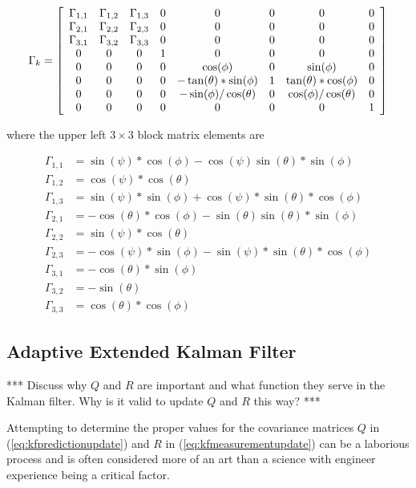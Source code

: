 \begin{align*}
\Gamma_k = \left[\begin{array}{c c c c c c c c}
\Gamma_{1,1} & \Gamma_{1,2} & \Gamma_{1,3} & 0 & 0 & 0 & 0 & 0 \\
\Gamma_{2,1} & \Gamma_{2,2} & \Gamma_{2,3} & 0 & 0 & 0 & 0 & 0 \\
\Gamma_{3,1} & \Gamma_{3,2} & \Gamma_{3,3} & 0 & 0 & 0 & 0 & 0 \\
0 & 0 & 0 & 1 & 0 & 0 & 0 & 0 \\
0 & 0 & 0 & 0 & \cos(\phi) & 0 & \sin(\phi) & 0 \\
0 & 0 & 0 & 0 & -\tan(\theta)*\sin(\phi) & 1 & \tan(\theta)*\cos(\phi) & 0 \\
0 & 0 & 0 & 0 & -\sin(\phi) / \cos(\theta) & 0 & \cos(\phi)/\cos(\theta) & 0 \\
0 & 0 & 0 & 0 & 0 & 0 & 0 & 1
\end{array}\right]
\end{align*}

where the upper left $3\times 3$ block matrix elements are

\begin{align*}
\Gamma_{1,1} &= \sin(\psi)*\cos(\phi)-\cos(\psi)\sin(\theta)*\sin(\phi) \\
\Gamma_{1,2} &= \cos(\psi)*\cos(\theta) \\
\Gamma_{1,3} &= \sin(\psi)*\sin(\phi)+\cos(\psi)*\sin(\theta)*\cos(\phi) \\
\Gamma_{2,1} &= -\cos(\theta)*\cos(\phi)-\sin(\theta)\sin(\theta)*\sin(\phi) \\
\Gamma_{2,2} &= \sin(\psi)*\cos(\theta) \\
\Gamma_{2,3} &= -\cos(\psi)*\sin(\phi)-\sin(\psi)*\sin(\theta)*\cos(\phi) \\
\Gamma_{3,1} &= -\cos(\theta)*\sin(\phi) \\
\Gamma_{3,2} &= -\sin(\theta) \\
\Gamma_{3,3} &= \cos(\theta)*\cos(\phi)
\end{align*}

\subsection{Adaptive Extended Kalman Filter}
\label{sec:adaptiveekf}
*** Discuss why $Q$ and $R$ are important and what function they serve in the Kalman filter. Why is it valid to update $Q$ and $R$ this way? ***

Attempting to determine the proper values for the covariance matrices $Q$ in (\ref{eq:kfpredictionupdate}) and $R$ in (\ref{eq:kfmeasurementupdate}) can be a laborious process and is often considered more of an art than a science with engineer experience being a critical factor.

